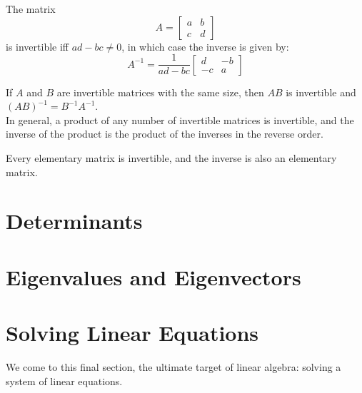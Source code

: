 \documentclass{report}
\begin{document}
		\begin{thm}
			The matrix
			\begin{displaymath}
				A=
				\begin{bmatrix}
					a & b \\ c & d
				\end{bmatrix}
			\end{displaymath}
			is invertible iff $ad-bc\ne0$, in which case the inverse is given by:
			\begin{displaymath}
				A^{-1}=\frac{1}{ad-bc}
				\begin{bmatrix}
					d & -b \\ -c & a
				\end{bmatrix}
			\end{displaymath}
		\end{thm}
		
		\begin{thm}
			If $A$ and $B$ are invertible matrices with the same size, then $AB$ is invertible and $(AB)^{-1}=B^{-1}A^{-1}$.\\
			In general, a product of any number of invertible matrices is invertible, and the inverse of the product is the product of the inverses in the reverse order.
		\end{thm}
		
		\begin{thm}
			Every elementary matrix is invertible, and the inverse is also an elementary matrix.
		\end{thm}
	
	\section{Determinants}
		\subsection{}
	
	\section{Eigenvalues and Eigenvectors}
		\subsection{}
	
	\section{Solving Linear Equations}
	We come to this final section, the ultimate target of linear algebra: solving a system of linear equations.
\end{document}
